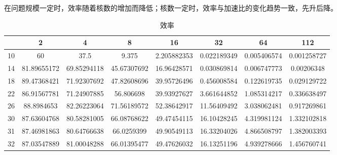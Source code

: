 \documentclass[10pt,letterpaper]{ctexart}
\begin{document}
\par 在问题规模一定时，效率随着核数的增加而降低；核数一定时，效率与加速比的变化趋势一致，先升后降。
\begin{table}[!htbp]
    \centering
    \begin{tabular}{c|ccccccc}
        \toprule
        & 2 & 4 & 8 & 16 & 32 & 64 & 112\\
        \hline
        10 & 60 & 37.5 & 9.375 & 2.205882353 & 0.022189349 & 0.005406574 & 0.001258727\\
        14 & 81.89655172 & 69.85294118 & 45.67307692 & 16.96428571 & 0.030869814 & 0.006747773 & 0.00206348\\
        18 & 89.47368421 & 71.92307692 & 47.82608696 & 39.95726496 & 0.456008584 & 0.122619735 & 0.029129722\\
        22 & 86.91567781 & 71.24907885 & 56.806698 & 39.93927627 & 3.661644852 & 1.085314217 & 0.336638497\\
        26 & 88.8984653 & 82.26223064 & 71.56189572 & 52.38642917 & 11.56409492 & 3.038062481 & 0.917269861\\
        30 & 87.63604768 & 80.58281005 & 66.08768622 & 49.47454115 & 16.10428245 & 4.319981124 & 1.332102818\\
        31 & 87.46981863 & 80.64766638 & 66.0259399 & 49.90549113 & 16.33204026 & 4.866508797 & 1.382003393\\
        32 & 87.03547889 & 81.00048288 & 66.01395477 & 49.47626032 & 16.13251196 & 4.939278666 & 1.456760741\\
        \bottomrule
    \end{tabular}
    \caption{效率} \label{tab:speedup}
\end{table}
\end{document}
